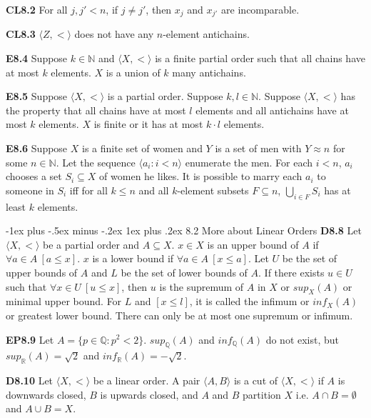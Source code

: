 \documentclass[10pt, landscape]{article}
\makeatletter
\renewcommand{\subsection}{\@startsection{subsection}{3}{0mm}%
                                {-1ex plus -.5ex minus -.2ex}%
                                {1ex plus .2ex}%
                                {\normalfont\small\bfseries}}%
\makeatother
\begin{document}
\begin{multicols*}{3}
\textbf{CL8.2} For all $j, j' < n$, if $j \neq j'$, then $x_j$ and $x_{j'}$ are incomparable.

\textbf{CL8.3} $\langle Z, < \rangle$ does not have any $n$-element antichains.

\textbf{E8.4} Suppose $k \in \mathbb{N}$ and $\langle X, < \rangle$ is a finite partial order such that all chains have at most $k$ elements. $X$ is a union of $k$ many antichains.

\textbf{E8.5} Suppose $\langle X, < \rangle$ is a partial order. Suppose $k, l \in \mathbb{N}$. Suppose $\langle X, < \rangle$ has the property that all chains have at most $l$ elements and all antichains have at most $k$ elements. $X$ is finite or it has at most $k \cdot l$ elements.

\textbf{E8.6} Suppose $X$ is a finite set of women and $Y$ is a set of men with $Y \approx n$ for some $n \in \mathbb{N}$. Let the sequence $\langle a_i : i < n \rangle$ enumerate the men. For each $i< n$, $a_i$ chooses a set $S_i \subseteq X$ of women he likes. It is possible to marry each $a_i$ to someone in $S_i$ iff for all $k \leq n$ and all $k$-element subsets $F \subseteq n$, $\bigcup_{i \in F}S_i$ has at least $k$ elements.

\subsection{8.2 More about Linear Orders}
\textbf{D8.8} Let $\langle X, < \rangle$ be a partial order and $A \subseteq X$. $x \in X$ is an upper bound of $A$ if $\forall a \in A \ [a \leq x]$. $x$ is a lower bound if $\forall a \in A \ [x \leq a]$. Let $U$ be the set of upper bounds of $A$ and $L$ be the set of lower bounds of $A$. If there exists $u \in U$ such that $\forall x \in U \ [u \leq x]$, then $u$ is the supremum of $A$ in $X$ or $sup_X(A)$ or minimal upper bound. For $L$ and $[x \leq l]$, it is called the infimum or $inf_X(A)$ or greatest lower bound. There can only be at most one supremum or infimum.

\textbf{EP8.9} Let $A=\{p \in \mathbb{Q} : p^2 < 2\}$. $sup_\mathbb{Q}(A)$ and $inf_\mathbb{Q}(A)$ do not exist, but $sup_\mathbb{R}(A)=\sqrt2$ and $inf_\mathbb{R}(A)=-\sqrt2$.

\textbf{D8.10} Let $\langle X, < \rangle$ be a linear order. A pair $\langle A, B \rangle$ is a cut of $\langle X, < \rangle$ if $A$ is downwards closed, $B$ is upwards closed, and $A$ and $B$ partition $X$ i.e. $A \cap B = \emptyset$ and $A \cup B = X$.


\end{multicols*}
\end{document}

